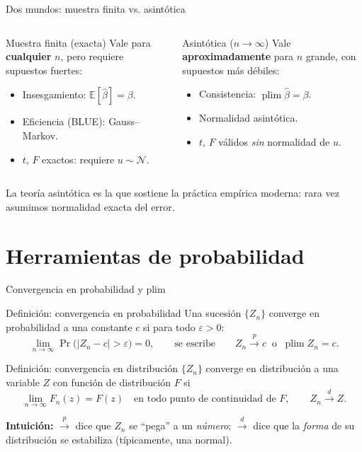 \documentclass{beamer}
\DeclareMathOperator*{\plim}{plim}
\begin{document}
\begin{frame}{Dos mundos: muestra finita vs. asintótica}
\begin{columns}
  \begin{block}{Muestra finita (exacta)}
  Vale para \textbf{cualquier} $n$, pero requiere supuestos fuertes:
  \begin{itemize}
    \item Insesgamiento: $\mathbb{E}[\hat{\beta}]=\beta$.
    \item Eficiencia (BLUE): Gauss--Markov.
    \item $t$, $F$ exactos: requiere $u\sim\mathcal{N}$.
  \end{itemize}
  \end{block}

  \begin{alertblock}{Asintótica ($n\to\infty$)}
  Vale \textbf{aproximadamente} para $n$ grande, con supuestos más débiles:
  \begin{itemize}
    \item Consistencia: $\plim\hat{\beta}=\beta$.
    \item Normalidad asintótica.
    \item $t$, $F$ válidos \emph{sin} normalidad de $u$.
  \end{itemize}
  \end{alertblock}
\end{columns}
\vspace{0.3cm}
{\small La teoría asintótica es la que sostiene la práctica empírica moderna: rara vez asumimos normalidad exacta del error.}
\end{frame}

\section{Herramientas de probabilidad}

\begin{frame}{Convergencia en probabilidad y plim}
    \begin{block}{Definición: convergencia en probabilidad}
    Una sucesión $\{Z_n\}$ converge en probabilidad a una constante $c$ si para todo $\varepsilon>0$:
    \[
    \lim_{n\to\infty}\Pr\big(|Z_n - c| > \varepsilon\big) = 0,
    \qquad\text{se escribe}\qquad Z_n \overset{p}{\to} c \;\;\text{o}\;\; \plim Z_n = c.
    \]
    \end{block}
    \pause
    \begin{block}{Definición: convergencia en distribución}
    $\{Z_n\}$ converge en distribución a una variable $Z$ con función de distribución $F$ si
    \[
    \lim_{n\to\infty} F_n(z) = F(z) \quad\text{en todo punto de continuidad de }F,
    \qquad Z_n \overset{d}{\to} Z.
    \]
    \end{block}
    \pause
    {\small \textbf{Intuición:} $\overset{p}{\to}$ dice que $Z_n$ se ``pega'' a un \emph{número}; $\overset{d}{\to}$ dice que la \emph{forma} de su distribución se estabiliza (típicamente, una normal).}
\end{frame}
\end{document}
